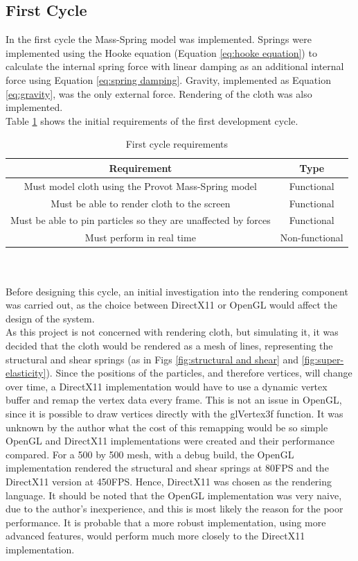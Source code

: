 \subsection{First Cycle}
In the first cycle the Mass-Spring model was implemented. Springs were implemented using the Hooke equation (Equation \ref{eq:hooke equation}) to calculate the internal spring force with linear damping as an additional internal force using Equation \ref{eq:spring damping}. Gravity, implemented as Equation \ref{eq:gravity}, was the only external force. Rendering of the cloth was also implemented.
\\Table \ref{tab:cycle 1 require} shows the initial requirements of the first development cycle.
\begin{table}[tp]
   \begin{minipage}{\textwidth}
      \begin{center}
         \begin{tabular}{c|c}
           Requirement & Type\\
           \hline
           Must model cloth using the Provot Mass-Spring model & Functional\\
           Must be able to render cloth to the screen & Functional\\
           Must be able to pin particles so they are unaffected by forces & Functional\\
           Must perform in real time& Non-functional\\
         \end{tabular}
      \end{center}
   \end{minipage}
   \caption{First cycle requirements}
   \label{tab:cycle 1 require}
\end{table}
\\\\Before designing this cycle, an initial investigation into the rendering component was carried out, as the choice between DirectX11 or OpenGL would affect the design of the system.
\\As this project is not concerned with rendering cloth, but simulating it, it was decided that the cloth would be rendered as a mesh of lines, representing the structural and shear springs (as in Figs \ref{fig:structural and shear} and \ref{fig:super-elasticity}). Since the positions of the particles, and therefore vertices, will change over time, a DirectX11 implementation would have to use a dynamic vertex buffer and remap the vertex data every frame. This is not an issue in OpenGL, since it is possible to draw vertices directly with the glVertex3f function. It was unknown by the author what the cost of this remapping would be so simple OpenGL and DirectX11 implementations were created and their performance compared. For a 500 by 500 mesh, with a debug build, the OpenGL implementation rendered the structural and shear springs at 80FPS and the DirectX11 version at 450FPS. Hence, DirectX11 was chosen as the rendering language. It should be noted that the OpenGL implementation was very naive, due to the author's inexperience, and this is most likely the reason for the poor performance. It is probable that a more robust implementation, using more advanced features, would perform much more closely to the DirectX11 implementation.
